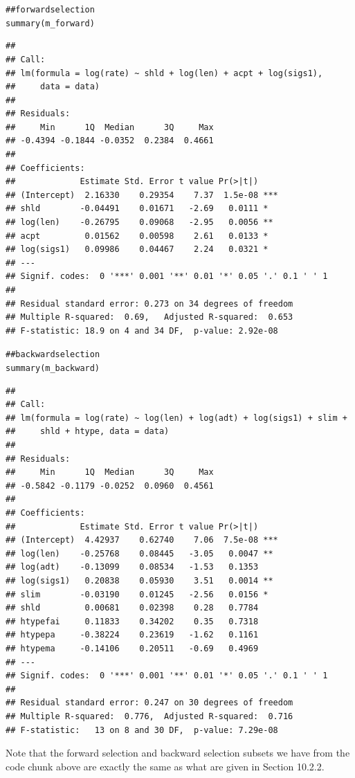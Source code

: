 \documentclass[12pt,oneside,a4paper]{article}\usepackage[]{graphicx}\usepackage[]{xcolor}
\makeatletter
\newcommand{\hlcom}[1]{\textcolor[rgb]{0.443,0.478,0.702}{#1}}%
\newcommand{\hlstd}[1]{\textcolor[rgb]{0,0,0}{#1}}%
\newcommand{\hlkwd}[1]{\textcolor[rgb]{0,0,0}{#1}}%
\newenvironment{kframe}{%
 \def\at@end@of@kframe{}%
 \ifinner\ifhmode%
  \def\at@end@of@kframe{\end{minipage}}%
  \begin{minipage}{\columnwidth}%
 \fi\fi%
 \def\FrameCommand##1{\hskip\@totalleftmargin \hskip-\fboxsep
 \colorbox{shadecolor}{##1}\hskip-\fboxsep
     \hskip-\linewidth \hskip-\@totalleftmargin \hskip\columnwidth}%
 \MakeFramed {\advance\hsize-\width
   \@totalleftmargin\z@ \linewidth\hsize
   \@setminipage}}%
 {\par\unskip\endMakeFramed%
 \at@end@of@kframe}
\newenvironment{knitrout}{}{} %
\makeatother
\begin{document}
\begin{knitrout}
\begin{kframe}
\begin{alltt}
\hlcom{## forward selection}
\hlkwd{summary}\hlstd{(m_forward)}
\end{alltt}
\begin{verbatim}
## 
## Call:
## lm(formula = log(rate) ~ shld + log(len) + acpt + log(sigs1), 
##     data = data)
## 
## Residuals:
##     Min      1Q  Median      3Q     Max 
## -0.4394 -0.1844 -0.0352  0.2384  0.4661 
## 
## Coefficients:
##             Estimate Std. Error t value Pr(>|t|)    
## (Intercept)  2.16330    0.29354    7.37  1.5e-08 ***
## shld        -0.04491    0.01671   -2.69   0.0111 *  
## log(len)    -0.26795    0.09068   -2.95   0.0056 ** 
## acpt         0.01562    0.00598    2.61   0.0133 *  
## log(sigs1)   0.09986    0.04467    2.24   0.0321 *  
## ---
## Signif. codes:  0 '***' 0.001 '**' 0.01 '*' 0.05 '.' 0.1 ' ' 1
## 
## Residual standard error: 0.273 on 34 degrees of freedom
## Multiple R-squared:  0.69,	Adjusted R-squared:  0.653 
## F-statistic: 18.9 on 4 and 34 DF,  p-value: 2.92e-08
\end{verbatim}
\begin{alltt}
\hlcom{## backward selection}
\hlkwd{summary}\hlstd{(m_backward)}
\end{alltt}
\begin{verbatim}
## 
## Call:
## lm(formula = log(rate) ~ log(len) + log(adt) + log(sigs1) + slim + 
##     shld + htype, data = data)
## 
## Residuals:
##     Min      1Q  Median      3Q     Max 
## -0.5842 -0.1179 -0.0252  0.0960  0.4561 
## 
## Coefficients:
##             Estimate Std. Error t value Pr(>|t|)    
## (Intercept)  4.42937    0.62740    7.06  7.5e-08 ***
## log(len)    -0.25768    0.08445   -3.05   0.0047 ** 
## log(adt)    -0.13099    0.08534   -1.53   0.1353    
## log(sigs1)   0.20838    0.05930    3.51   0.0014 ** 
## slim        -0.03190    0.01245   -2.56   0.0156 *  
## shld         0.00681    0.02398    0.28   0.7784    
## htypefai     0.11833    0.34202    0.35   0.7318    
## htypepa     -0.38224    0.23619   -1.62   0.1161    
## htypema     -0.14106    0.20511   -0.69   0.4969    
## ---
## Signif. codes:  0 '***' 0.001 '**' 0.01 '*' 0.05 '.' 0.1 ' ' 1
## 
## Residual standard error: 0.247 on 30 degrees of freedom
## Multiple R-squared:  0.776,	Adjusted R-squared:  0.716 
## F-statistic:   13 on 8 and 30 DF,  p-value: 7.29e-08
\end{verbatim}
\end{kframe}
\end{knitrout}

Note that the forward selection and backward selection subsets we have from the code chunk above are exactly the same as what are given in Section 10.2.2.
\end{document}
